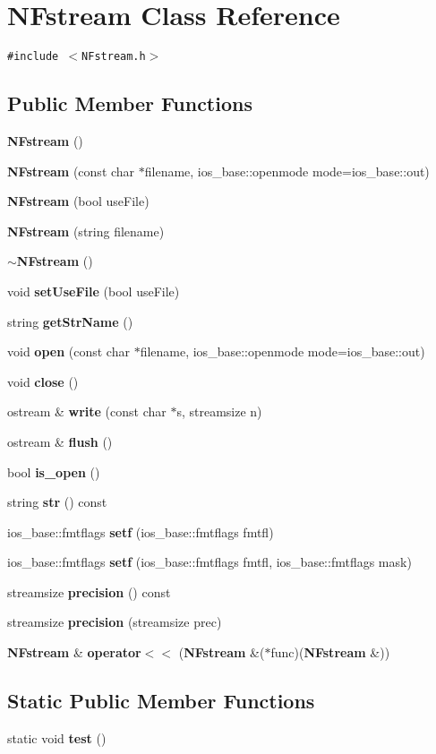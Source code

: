\section{NFstream Class Reference}
\label{classNFstream}
{\tt \#include $<$NFstream.h$>$}

\subsection*{Public Member Functions}
\begin{CompactItemize}
\item 
{\bf NFstream} ()
\item 
{\bf NFstream} (const char $\ast$filename, ios\_\-base::openmode mode=ios\_\-base::out)
\item 
{\bf NFstream} (bool useFile)
\item 
{\bf NFstream} (string filename)
\item 
{\bf $\sim$NFstream} ()
\item 
void {\bf setUseFile} (bool useFile)
\item 
string {\bf getStrName} ()
\item 
void {\bf open} (const char $\ast$filename, ios\_\-base::openmode mode=ios\_\-base::out)
\item 
void {\bf close} ()
\item 
ostream \& {\bf write} (const char $\ast$s, streamsize n)
\item 
ostream \& {\bf flush} ()
\item 
bool {\bf is\_\-open} ()
\item 
string {\bf str} () const 
\item 
ios\_\-base::fmtflags {\bf setf} (ios\_\-base::fmtflags fmtfl)
\item 
ios\_\-base::fmtflags {\bf setf} (ios\_\-base::fmtflags fmtfl, ios\_\-base::fmtflags mask)
\item 
streamsize {\bf precision} () const 
\item 
streamsize {\bf precision} (streamsize prec)
\item 
{\bf NFstream} \& {\bf operator$<$$<$} ({\bf NFstream} \&($\ast$func)({\bf NFstream} \&))
\end{CompactItemize}
\subsection*{Static Public Member Functions}
\begin{CompactItemize}
\item 
static void {\bf test} ()
\end{CompactItemize}
